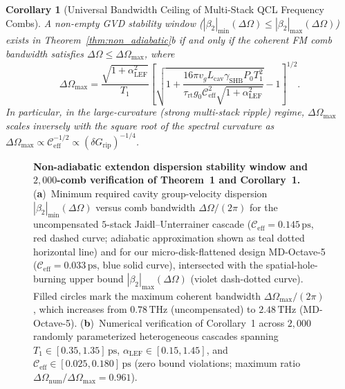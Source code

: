 \documentclass[11pt,letterpaper]{article}
\newtheorem{corollary}{Corollary}
\begin{document}
\begin{corollary}[Universal Bandwidth Ceiling of Multi-Stack QCL Frequency Combs]
\label{cor:max_bandwidth}
A non-empty GVD stability window ($|\beta_2|_{\min}(\Delta\Omega) \le |\beta_2|_{\max}(\Delta\Omega)$) exists in Theorem~\ref{thm:non_adiabatic}b if and only if the coherent FM comb bandwidth satisfies $\Delta\Omega \le \Delta\Omega_{\max}$, where
\begin{equation}
\Delta\Omega_{\max} = \frac{\sqrt{1 + \alpha_{\mathrm{LEF}}^2}}{T_1}\left[ \sqrt{1 + \frac{16\pi v_g L_{\mathrm{cav}} \gamma_{\mathrm{SHB}} P_0 T_1^2}{\tau_{\mathrm{rt}} g_0 \mathcal{C}_{\mathrm{eff}}^2 \sqrt{1 + \alpha_{\mathrm{LEF}}^2}}} - 1 \right]^{1/2}.
\label{eq:cor1_bw_ceiling}
\end{equation}
In particular, in the large-curvature (strong multi-stack ripple) regime, $\Delta\Omega_{\max}$ scales inversely with the square root of the spectral curvature as $\Delta\Omega_{\max} \propto \mathcal{C}_{\mathrm{eff}}^{-1/2} \propto (\delta G_{\mathrm{rip}})^{-1/4}$.
\end{corollary}

\begin{figure}[t!]
\centering
\resizebox{0.97\textwidth}{!}{}
\caption{\textbf{Non-adiabatic extendon dispersion stability window and $2{,}000$-comb verification of Theorem~1 and Corollary~1.} (\textbf{a})~Minimum required cavity group-velocity dispersion $|\beta_2|_{\min}(\Delta\Omega)$ versus comb bandwidth $\Delta\Omega/(2\pi)$ for the uncompensated $5$-stack Jaidl--Unterrainer cascade ($\mathcal{C}_{\mathrm{eff}} = 0.145\,\mathrm{ps}$, red dashed curve; adiabatic approximation shown as teal dotted horizontal line) and for our micro-disk-flattened design MD-Octave-5 ($\mathcal{C}_{\mathrm{eff}} = 0.033\,\mathrm{ps}$, blue solid curve), intersected with the spatial-hole-burning upper bound $|\beta_2|_{\max}(\Delta\Omega)$ (violet dash-dotted curve). Filled circles mark the maximum coherent bandwidth $\Delta\Omega_{\max}/(2\pi)$, which increases from $0.78\,\mathrm{THz}$ (uncompensated) to $2.48\,\mathrm{THz}$ (MD-Octave-5). (\textbf{b})~Numerical verification of Corollary~1 across $2{,}000$ randomly parameterized heterogeneous cascades spanning $T_1 \in [0.35, 1.35]\,\mathrm{ps}$, $\alpha_{\mathrm{LEF}} \in [0.15, 1.45]$, and $\mathcal{C}_{\mathrm{eff}} \in [0.025, 0.180]\,\mathrm{ps}$ (zero bound violations; maximum ratio $\Delta\Omega_{\mathrm{num}}/\Delta\Omega_{\max} = 0.961$).}
\label{fig:non_adiabatic}
\end{figure}
\end{document}
